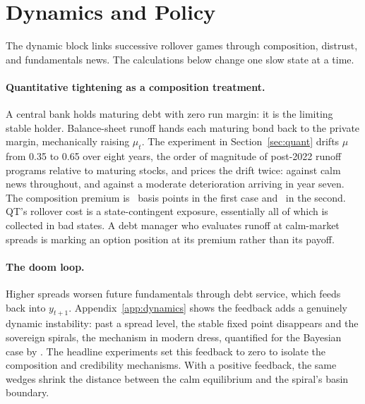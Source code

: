 \documentclass[11pt]{article}
\theoremstyle{definition}
\begin{document}
\section{Dynamics and Policy}\label{sec:policy}

The dynamic block links successive rollover games through composition, distrust, and fundamentals news. The calculations below change one slow state at a time.

\paragraph{Quantitative tightening as a composition treatment.} A central bank holds maturing debt with zero run margin: it is the limiting stable holder. Balance-sheet runoff hands each maturing bond back to the private margin, mechanically raising $\mu_t$. The experiment in Section~\ref{sec:quant} drifts $\mu$ from 0.35 to 0.65 over eight years, the order of magnitude of post-2022 runoff programs relative to maturing stocks, and prices the drift twice: against calm news throughout, and against a moderate deterioration arriving in year seven. The composition premium is \QTPremCalm\ basis points in the first case and \QTPremShock\ in the second. QT's rollover cost is a state-contingent exposure, essentially all of which is collected in bad states. A debt manager who evaluates runoff at calm-market spreads is marking an option position at its premium rather than its payoff.

\paragraph{The doom loop.} Higher spreads worsen future fundamentals through debt service, which feeds back into $y_{t+1}$. Appendix~\ref{app:dynamics} shows the feedback adds a genuinely dynamic instability: past a spread level, the stable fixed point disappears and the sovereign spirals, the \citet{Calvo1988} mechanism in modern dress, quantified for the Bayesian case by \citet{BocolaDovis2019}. The headline experiments set this feedback to zero to isolate the composition and credibility mechanisms. With a positive feedback, the same wedges shrink the distance between the calm equilibrium and the spiral's basin boundary.
\end{document}
